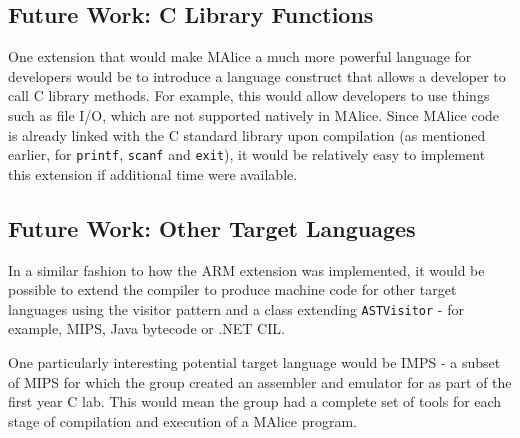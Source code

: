 \documentclass[a4wide, 11pt]{article}
\begin{document}
\newpage

\subsection{Future Work: C Library Functions}

One extension that would make MAlice a much more powerful language for 
developers would be to introduce a language construct that allows a developer 
to call C library methods. For example, this would allow developers to use 
things such as file I/O, which are not supported natively in MAlice. Since 
MAlice code is already linked with the C standard library upon compilation
(as mentioned earlier, for \texttt{printf}, \texttt{scanf} and \texttt{exit}),
it would be relatively easy to implement this extension if additional time
were available.

\subsection{Future Work: Other Target Languages}
In a similar fashion to how the ARM extension was implemented, it would be 
possible to extend the compiler to produce machine code for other target 
languages using the visitor pattern and a class extending \texttt{ASTVisitor} -
for example, MIPS, Java bytecode or .NET CIL. 

One particularly interesting potential target language would be IMPS - a subset
of MIPS for which the group created an assembler and emulator for as part of the
first year C lab. This would mean the group had a complete set of tools for
each stage of compilation and execution of a MAlice program.

\enddocument
\end{document}
